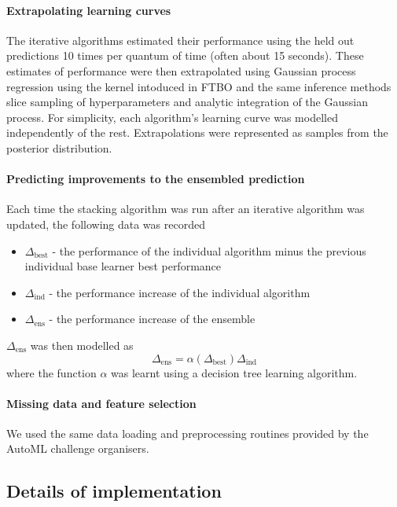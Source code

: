 \documentclass{article} %
\begin{document}
\paragraph{Extrapolating learning curves}

The iterative algorithms estimated their performance using the held out predictions 10 times per quantum of time (often about 15 seconds).
These estimates of performance were then extrapolated using Gaussian process regression using the kernel intoduced in FTBO and the same inference methods \ie slice sampling of hyperparameters and analytic integration of the Gaussian process.
For simplicity, each algorithm's learning curve was modelled independently of the rest.
Extrapolations were represented as samples from the posterior distribution.

\paragraph{Predicting improvements to the ensembled prediction}

Each time the stacking algorithm was run after an iterative algorithm was updated, the following data was recorded
\begin{itemize}
  \item $\Delta_\textrm{best}$ - the performance of the individual algorithm minus the previous individual base learner best performance
  \item $\Delta_\textrm{ind}$ - the performance increase of the individual algorithm
  \item $\Delta_\textrm{ens}$ - the performance increase of the ensemble
\end{itemize}
$\Delta_\textrm{ens}$ was then modelled as
\[
  \Delta_\textrm{ens} = \alpha(\Delta_\textrm{best})\Delta_\textrm{ind}
\]
where the function $\alpha$ was learnt using a decision tree learning algorithm.

\paragraph{Missing data and feature selection}

We used the same data loading and preprocessing routines provided by the AutoML challenge organisers.

\subsection{Details of implementation}
\end{document}
